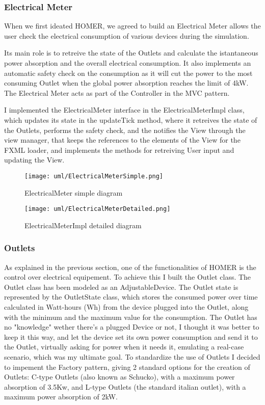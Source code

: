 \subsubsection*{Electrical Meter}
When we first ideated HOMER, we agreed to build an Electrical Meter allows the user check the electrical consumption of various devices during the simulation.

Its main role is to retreive the state of the Outlets and calculate the istantaneous power absorption and the overall electrical consumption.
It also implements an automatic safety check on the consumption as it will cut the power to the most consuming Outlet when the global power absorption reaches the limit of 4kW.
The Electrical Meter acts as part of the Controller in the MVC pattern. 

I implemented the ElectricalMeter interface in the ElectricalMeterImpl class, which updates its state in the updateTick method, where it retreives the state of the Outlets, 
performs the safety check, and the notifies the View through the view manager, that keeps the references to the elements of the View for the FXML loader, 
and implements the methods for retreiving User input and updating the View.

\begin{figure}[H]
    \centering{}
    \texttt{[image: uml/ElectricalMeterSimple.png]}
    \caption{ElectricalMeter simple diagram}
    \label{monticelli:uml:meter}
\end{figure}

\begin{figure}[H]
    \centering{}
    \texttt{[image: uml/ElectricalMeterDetailed.png]}
    \caption{ElectricalMeterImpl detailed diagram}
    \label{monticelli:uml:meter}
\end{figure}

\subsubsection{Outlets}
As explained in the previous section, one of the functionalities of HOMER is the control over electrical equipement. To achieve this I built the Outlet class.
The Outlet class has been modeled as an AdjustableDevice.
The Outlet state is represented by the OutletState class, which stores the consumed power over time calculated in Watt-hours (Wh) from the device plugged into the Outlet, along with the minimum and the maximum value for the consumption.
The Outlet has no "knowledge" wether there's a plugged Device or not, I thought it was better to keep it this way, and let the device set its own power consumption and send it to the Outlet, virtually asking for power when it needs it, emulating a real-case scenario, 
which was my ultimate goal.
To standardize the use of Outlets I decided to impement the Factory pattern, giving 2 standard options for the creation of Outlets: C-type Outlets (also known as Schucko), with a maximum power absorption of 3.5Kw, 
and L-type Outlets (the standard italian outlet), with a maximum power absorption of 2kW.

